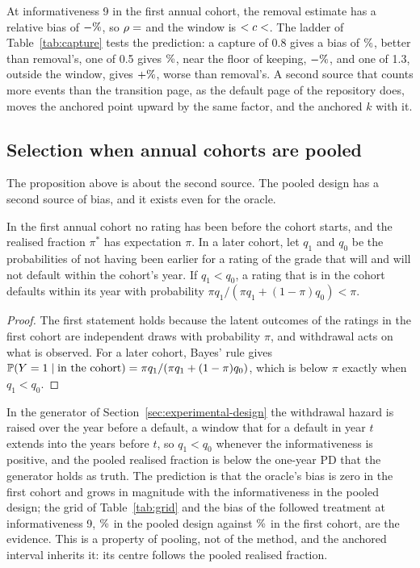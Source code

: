 At informativeness 9 in the first annual cohort, the removal estimate has a relative bias of $-\nv{abias.fy.i9.industry}\%$, so $\rho=\nv{rho.fy.i9}$ and the window is $\nv{rho.fy.i9}<c<\nv{rho.hi.fy.i9}$. The ladder of Table~\ref{tab:capture} tests the prediction: a capture of 0.8 gives a bias of $\nv{cap.i9.c0.8.bias}\%$, better than removal's, one of 0.5 gives $\nv{cap.i9.c0.5.bias}\%$, near the floor of keeping, $-\nv{abias.fy.i9.unfollowed}\%$, and one of 1.3, outside the window, gives $+\nv{cap.i9.c1.3.abias}\%$, worse than removal's. A second source that counts more events than the transition page, as the default page of the repository does, moves the anchored point upward by the same factor, and the anchored $k$ with it.

\subsection{Selection when annual cohorts are pooled}

The proposition above is about the second source. The pooled design has a second source of bias, and it exists even for the oracle.

\begin{proposition}[selection]
\label{prop:selection}
In the first annual cohort no rating has been \wdn{} before the cohort starts, and the realised fraction $\pi^{\ast}$ has expectation $\pi$. In a later cohort, let $q_1$ and $q_0$ be the probabilities of not having been \wdn{} earlier for a rating of the grade that will and will not default within the cohort's year. If $q_1<q_0$, a rating that is in the cohort defaults within its year with probability $\pi q_1/(\pi q_1+(1-\pi)q_0)<\pi$.
\end{proposition}
\begin{proof}
The first statement holds because the latent outcomes of the ratings in the first cohort are independent draws with probability $\pi$, and withdrawal acts on what is observed. For a later cohort, Bayes' rule gives $\mathbb{P}(Y=1\mid\text{in the cohort})=\pi q_1/(\pi q_1+(1-\pi)q_0)$, which is below $\pi$ exactly when $q_1<q_0$.
\end{proof}
In the generator of Section~\ref{sec:experimental-design} the withdrawal hazard is raised over the year before a default, a window that for a default in year $t$ extends into the years before $t$, so $q_1<q_0$ whenever the informativeness is positive, and the pooled realised fraction is below the one-year PD that the generator holds as truth. The prediction is that the oracle's bias is zero in the first cohort and grows in magnitude with the informativeness in the pooled design; the grid of Table~\ref{tab:grid} and the bias of the followed treatment at informativeness 9, $\nv{bias.pool.i9.followed}\%$ in the pooled design against $\nv{bias.fy.i9.followed}\%$ in the first cohort, are the evidence. This is a property of pooling, not of the method, and the anchored interval inherits it: its centre follows the pooled realised fraction.

